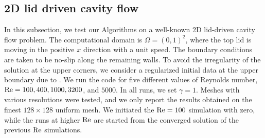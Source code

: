 \documentclass[3p]{elsarticle}
\def\V#1{\mathbf{#1}}
\begin{document}
\subsection{2D lid driven cavity flow}\label{lidalg1}
In this subsection, we test our Algorithms on a well-known 2D lid-driven cavity flow problem. The computational domain is $\Omega = (0,1)^2$, where the top lid is moving in the positive $x$ direction with a unit speed. The boundary conditions are taken to be no-slip along the remaining walls. To avoid the irregularity of the solution at the upper corners, we consider a regularized initial data at the upper boundary due to \cite{Frutos2016}.
%
We run the code for five different values of Reynolds number, ${\rm Re} = 100, 400, 1000, 3200$, and $5000$. In all runs, we set $\gamma = 1$. Meshes with various resolutions were tested, and we only report the results obtained on the finest $128 \times 128$ uniform mesh. We initiated the ${\rm Re}=100$ simulation with zero, while the runs at higher ${\rm Re}$ are started from the converged solution of the previous ${\rm Re}$ simulations.
\end{document}

